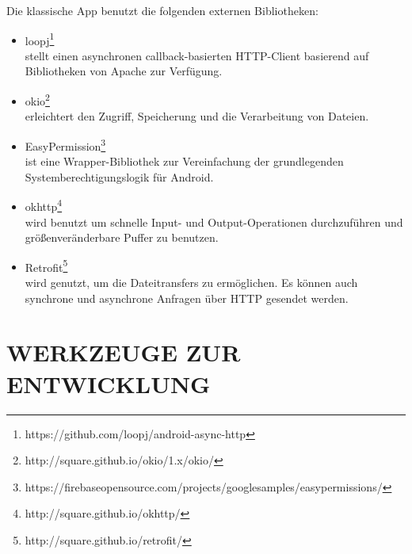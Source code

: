 \documentclass[a4paper,twoside]{article}
\begin{document}
	\noindent Die klassische App benutzt die folgenden externen Bibliotheken:
	\begin{itemize}
		\item loopj\footnote{https://github.com/loopj/android-async-http}\\
		stellt einen asynchronen callback-basierten HTTP-Client basierend auf Bibliotheken von Apache zur Verf\"ugung.
		\item okio\footnote{http://square.github.io/okio/1.x/okio/}\\
		erleichtert den Zugriff, Speicherung und die Verarbeitung von Dateien.
		\item EasyPermission\footnote{https://firebaseopensource.com/projects/googlesamples/easypermissions/} \\
		ist eine Wrapper-Bibliothek zur Vereinfachung der grundlegenden Systemberechtigungslogik f\"ur Android.
		\item okhttp\footnote{http://square.github.io/okhttp/} \\
		wird benutzt um schnelle Input- und Output-Operationen durchzuf\"uhren und gr\"o\ss{}enver\"anderbare Puffer zu benutzen.
		\item Retrofit\footnote{http://square.github.io/retrofit/} \\
		wird genutzt, um die Dateitransfers zu erm\"oglichen. Es k\"onnen auch synchrone und asynchrone Anfragen \"uber HTTP gesendet werden.
	\end{itemize}
	
	\section{\uppercase{Werkzeuge zur Entwicklung}}
	
\end{document}
